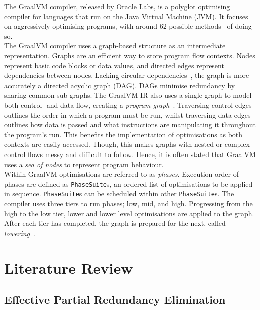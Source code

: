 \documentclass[12pt,openany,a4paper]{book}
\begin{document}
The GraalVM compiler, released by Oracle Labs, is a polyglot optimising compiler
for languages that run on the Java Virtual Machine (JVM). It focuses on aggressively
optimising programs, with around 62 possible methods~\cite{graalenterprise} of doing so.\\
The GraalVM compiler uses a graph-based structure as an intermediate
representation. Graphs are an efficient way to store program flow contexts. Nodes represent
basic code blocks or data values, and directed edges represent dependencies 
between nodes. Lacking circular dependencies~\cite{gir}, the graph is more accurately a
directed acyclic graph (DAG). DAGs minimise redundancy by sharing common sub-graphs.
The GraalVM IR also uses a single graph to model both control- and data-flow, 
creating a \emph{program-graph}~\cite{understanding}. Traversing control edges outlines the order in which
a program must be run, whilst traversing data edges outlines how data is
passed and what instructions are manipulating it throughout the program's run.
This benefits the implementation of optimisations as both contexts are easily
accessed. Though, this makes graphs with nested or complex control flows messy
and difficult to follow. Hence, it is often stated that GraalVM uses a
\emph{sea of nodes} to represent program behaviour.\\
Within GraalVM optimisations are referred to as \emph{phases}. Execution order of
phases are defined as \verb|PhaseSuite|s, an ordered list of optimisations to be
applied in sequence. \verb|PhaseSuite|s can be scheduled within other \verb|PhaseSuite|s.
The compiler uses three tiers to run phases; low, mid, and high. Progressing from
the high to the low tier, lower and lower level optimisations are applied to the
graph. After each tier has completed, the graph is prepared for the next, called
\emph{lowering}~\cite{poly-graal}.

\chapter{Literature Review}
\label{litrev}

\section{Effective Partial Redundancy Elimination}
\label{litrev1}
\end{document}
